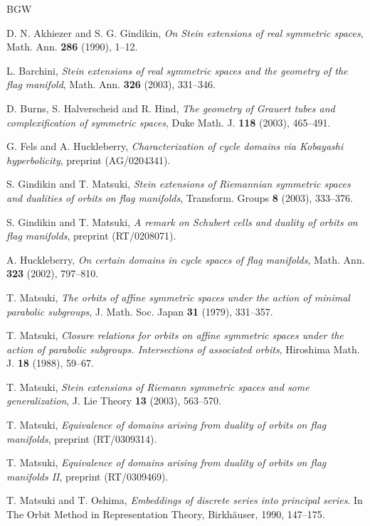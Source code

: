 \documentclass[12pt,a4paper]{amsart}
\theoremstyle{definition}
\theoremstyle{remark}
\numberwithin{equation}{section}
\begin{document}
\begin{thebibliography}{BGW}

D. N. Akhiezer and S. G. Gindikin,
\textit{On Stein extensions of real symmetric spaces},
Math. Ann. \textbf{286} (1990), 1--12.

L. Barchini,
\textit{Stein extensions of real symmetric spaces and the geometry of the flag manifold},
Math. Ann. \textbf{326} (2003), 331--346.

D. Burns, S. Halverscheid and R. Hind,
\textit{The geometry of Grauert tubes and complexification of symmetric spaces},
Duke Math. J. \textbf{118} (2003), 465--491.

G. Fels and A. Huckleberry,
\textit{Characterization of cycle domains via Kobayashi hyperbolicity},
preprint (AG/0204341).

S. Gindikin and T. Matsuki,
\textit{Stein extensions of Riemannian symmetric spaces and dualities of orbits on flag manifolds},
Transform. Groups \textbf{8} (2003), 333--376.

S. Gindikin and T. Matsuki,
\textit{A remark on Schubert cells and duality of orbits on flag manifolds},
preprint (RT/0208071).

A. Huckleberry,
\textit{On certain domains in cycle spaces of flag manifolds},
Math. Ann. \textbf{323} (2002), 797--810.

T. Matsuki,
\textit{The orbits of affine symmetric spaces under the action of minimal parabolic subgroups},
J. Math. Soc. Japan \textbf{31} (1979), 331--357.

T. Matsuki,
\textit{Closure relations for orbits on affine symmetric spaces under the action of parabolic subgroups. {I}ntersections of associated orbits},
Hiroshima Math. J. \textbf{18} (1988), 59--67.

T. Matsuki,
\textit{Stein extensions of Riemann symmetric spaces and some generalization},
J. Lie Theory \textbf{13} (2003), 563--570.

T. Matsuki,
\textit{Equivalence of domains arising from duality of orbits on flag manifolds},
preprint (RT/0309314).

T. Matsuki,
\textit{Equivalence of domains arising from duality of orbits on flag manifolds II},
preprint (RT/0309469).

T. Matsuki and T. Oshima,
\textit{Embeddings of discrete series into principal series}.
In The Orbit Method in Representation Theory, Birkh\"{a}user, 1990, 147--175.


\end{thebibliography}
\end{document}
